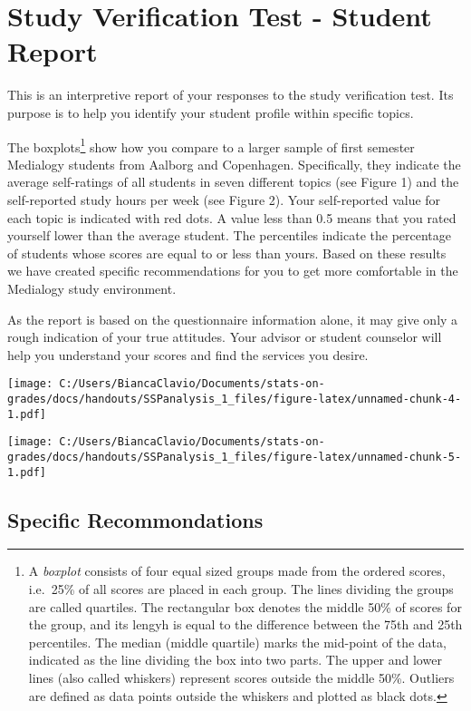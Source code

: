\documentclass[]{article}
\title{}
\author{}
\date{}
\let\rmarkdownfootnote\footnote%
\def\footnote{\protect\rmarkdownfootnote}
\begin{document}
\section{Study Verification Test - Student
Report}\label{study-verification-test---student-report}

This is an interpretive report of your responses to the study
verification test. Its purpose is to help you identify your student
profile within specific topics.

The boxplots\footnote{A \emph{boxplot} consists of four equal sized
  groups made from the ordered scores, i.e.~25\% of all scores are
  placed in each group. The lines dividing the groups are called
  quartiles. The rectangular box denotes the middle 50\% of scores for
  the group, and its lengyh is equal to the difference between the 75th
  and 25th percentiles. The median (middle quartile) marks the mid-point
  of the data, indicated as the line dividing the box into two parts.
  The upper and lower lines (also called whiskers) represent scores
  outside the middle 50\%. Outliers are defined as data points outside
  the whiskers and plotted as black dots.} show how you compare to a
larger sample of first semester Medialogy students from Aalborg and
Copenhagen. Specifically, they indicate the average self-ratings of all
students in seven different topics (see Figure 1) and the self-reported
study hours per week (see Figure 2). Your self-reported value for each
topic is indicated with red dots. A value less than 0.5 means that you
rated yourself lower than the average student. The percentiles indicate
the percentage of students whose scores are equal to or less than yours.
Based on these results we have created specific recommendations for you
to get more comfortable in the Medialogy study environment.

As the report is based on the questionnaire information alone, it may
give only a rough indication of your true attitudes. Your advisor or
student counselor will help you understand your scores and find the
services you desire.

\texttt{[image: C:/Users/BiancaClavio/Documents/stats-on-grades/docs/handouts/SSPanalysis\_1\_files/figure-latex/unnamed-chunk-4-1.pdf]}

\texttt{[image: C:/Users/BiancaClavio/Documents/stats-on-grades/docs/handouts/SSPanalysis\_1\_files/figure-latex/unnamed-chunk-5-1.pdf]}

\pagebreak

\subsection{Specific Recommondations}\label{specific-recommondations}
\end{document}

